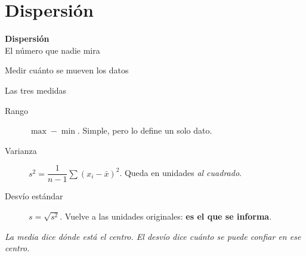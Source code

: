 \documentclass[aspectratio=169,10pt]{beamer}
\begin{document}
\section{Dispersión}

{
\begin{frame}[plain]
  \begin{center}
    {\Huge\bfseries\color{violetaOscuro} Dispersión}\\[0.6em]
    {\large El número que nadie mira}
  \end{center}
\end{frame}}

\begin{frame}{Medir cuánto se mueven los datos}
  \begin{block}{Las tres medidas}
    \begin{description}
      \item[Rango] $\max - \min$. Simple, pero lo define un solo dato.
      \item[Varianza] $s^2 = \dfrac{1}{n-1}\sum (x_i - \bar{x})^2$. Queda en unidades \emph{al cuadrado}.
      \item[Desvío estándar] $s = \sqrt{s^2}$. Vuelve a las unidades originales: \textbf{es el que se informa}.
    \end{description}
  \end{block}
  \vspace{0.4em}
  \begin{center}
  \emph{La media dice dónde está el centro. El desvío dice cuánto se puede confiar en ese centro.}
  \end{center}
\end{frame}
\end{document}
